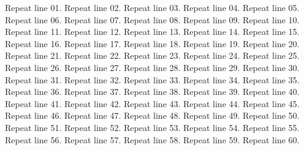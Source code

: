 \documentclass[paper={a5paper},maintitle={Repeat Break Test}]{ulsbs-songbook}
\begin{document}
\begin{ulSongs}{}
  \beginverse
    \beginrep
      \beginrep
      Repeat line 01.
      Repeat line 02.
      Repeat line 03.
      Repeat line 04.
      Repeat line 05.
      Repeat line 06.
      Repeat line 07.
      Repeat line 08.
      Repeat line 09.
      Repeat line 10.
      Repeat line 11.
      Repeat line 12.
      Repeat line 13.
      Repeat line 14.
      Repeat line 15.
      Repeat line 16.
      Repeat line 17.
      Repeat line 18.
      Repeat line 19.
      Repeat line 20.
      Repeat line 21.
      Repeat line 22.
      Repeat line 23.
      Repeat line 24.
      Repeat line 25.
      Repeat line 26.
      Repeat line 27.
      Repeat line 28.
      Repeat line 29.
      Repeat line 30.
      Repeat line 31.
      Repeat line 32.
      Repeat line 33.
      Repeat line 34.
      Repeat line 35.
      Repeat line 36.
      Repeat line 37.
      Repeat line 38.
      Repeat line 39.
      Repeat line 40.
      Repeat line 41.
      Repeat line 42.
      Repeat line 43.
      Repeat line 44.
      Repeat line 45.
      Repeat line 46.
      Repeat line 47.
      Repeat line 48.
      Repeat line 49.
      Repeat line 50.
      Repeat line 51.
      Repeat line 52.
      Repeat line 53.
      Repeat line 54.
      Repeat line 55.
      Repeat line 56.
      Repeat line 57.
      Repeat line 58.
      Repeat line 59.
      Repeat line 60.
      \endrep
    \endrep
  \endverse
\endsong
\end{ulSongs}
\end{document}
